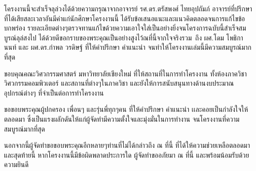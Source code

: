 \begin{acknowledgments}
\enskip \enskip \enskip \enskip \enskip โครงงานนี้จะสำเร็จลุล่วงได้ด้วยความกรุณาจากอาจารย์ รศ.ดร.ตรัสพงศ์ ไทยอุปถัมภ์     อาจารย์ที่ปรึกษาที่ได้เสียสละเวลาอันมีค่าแก่นักศึกษาโครงงานนี้
ได้รับข้อเสนอแนะและแนวคิดตลอดจนการแก้ไขข้อบกพร่อง รายละเอียดต่างๆตรวจทานแก้ไขด้วยความเอาใจใส่เป็นอย่างยิ่งจนโครงการฉบับนี้สำเร็จสมบูรณ์ลุล่สงไป ได้ด้วยดีขอกราบของพระคุณเป็นอย่างสูงไว้ณที่นี้จากใจจริงรวม\
ถึง ผศ.โดม โพธิกานนท์ และ ผศ.ดร.กำพล วรดิษฐ์ ที่ให้คําปรึกษา คำแนะนำ จนทําให้โครงงานเล่มนี้มีความสมบูรณ์มากที่สุด

\enskip \enskip ขอบคุณคณะวิศวกรรมศาสตร์ มหาวิทยาลัยเชียงใหม่ ที่ให้สถานที่ในการทําโครงงาน ทั้งห้องภาควิชาวิศวกรรมคอมพิวเตอร์ และสถานที่ต่างๆในภาควิชา และยังให้การสนับสนุนทางด้านงบประมาณ อุปกรณ์ต่างๆ ที่จำเป็นต่อการทำโครงงาน

\enskip \enskip ขอขอบพระคุณผู้ปกครอง เพื่อนๆ และรุ่นพี่ทุกๆคน ที่ให้คำปรึกษา คำแนะนำ เเละคอยเป็นกำลังใจให้ตลอดมา ซึ่งเป็นแรงผลักดันให้แก่ผู้จัดทํามีความตั้งใจและมุ่งมั่นในการทำงาน จนโครงงานที่ความสมบูรณ์มากที่สุด 

\enskip \enskip นอกจากนี้ผู้จัดทําขอขอบพระคุณอีกหลายๆท่านที่ไม่ได้กล่าวถึง ณ ที่นี้ ที่ได้ให้ความช่วยเหลือตลอดมา และสุดท้ายนี้ หากโครงงานนี้มีข้อผิดพลาดประการใด ผู้จัดทําขออภัยมา ณ ที่นี้ และพร้อมน้อมรับด้วยความยินดี



\end{acknowledgments}%
\fi %

\contentspage

\ifproject
\figurelistpage

\tablelistpage
\fi %



